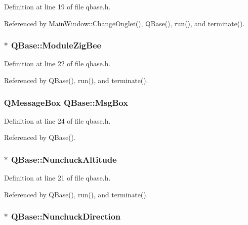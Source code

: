 Definition at line 19 of file qbase.\-h.



Referenced by Main\-Window\-::\-Change\-Onglet(), Q\-Base(), run(), and terminate().

\hypertarget{classQBase_a466b6191fec7cd0029dfc547a5437752}{
\subsubsection[{Module\-Zig\-Bee}]{$\ast$ Q\-Base\-::\-Module\-Zig\-Bee}}\label{classQBase_a466b6191fec7cd0029dfc547a5437752}


Definition at line 22 of file qbase.\-h.



Referenced by Q\-Base(), run(), and terminate().

\hypertarget{classQBase_aa75e9465559d8633736c52dae36ce1d0}{
\subsubsection[{Msg\-Box}]{\setlength{\rightskip}{0pt plus 5cm}Q\-Message\-Box Q\-Base\-::\-Msg\-Box\hspace{0.3cm}{\ttfamily [private]}}}\label{classQBase_aa75e9465559d8633736c52dae36ce1d0}


Definition at line 24 of file qbase.\-h.



Referenced by Q\-Base().

\hypertarget{classQBase_a615289f4d92be86986421ec16182ed90}{
\subsubsection[{Nunchuck\-Altitude}]{$\ast$ Q\-Base\-::\-Nunchuck\-Altitude}}\label{classQBase_a615289f4d92be86986421ec16182ed90}


Definition at line 21 of file qbase.\-h.



Referenced by Q\-Base(), run(), and terminate().

\hypertarget{classQBase_aa39545ef1795a91bf18db836cde0640d}{
\subsubsection[{Nunchuck\-Direction}]{$\ast$ Q\-Base\-::\-Nunchuck\-Direction}}\label{classQBase_aa39545ef1795a91bf18db836cde0640d}


